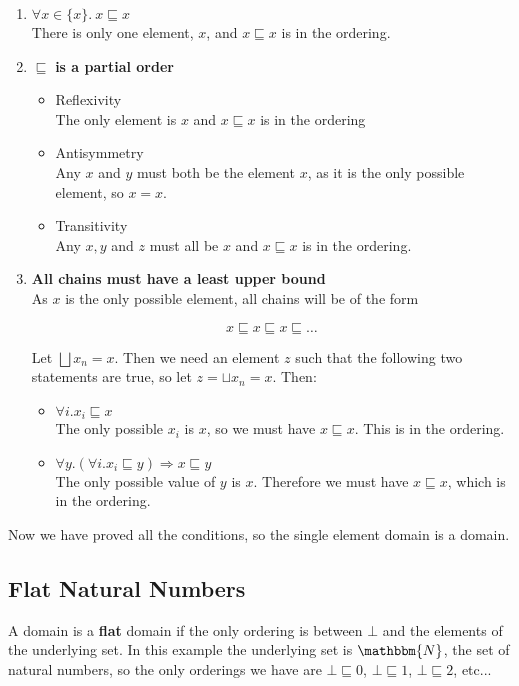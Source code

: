 \begin{enumerate}
\item{$\forall x \in \{x\}. \ x \sqsubseteq x$\\
There is only one element, $x$, and $x \sqsubseteq x$ is in the ordering.}
\item{$\sqsubseteq$ \textbf{is a partial order}
\begin{itemize}
\item{Reflexivity\\
The only element is $x$ and $x \sqsubseteq x$ is in the ordering}
\item{Antisymmetry\\
Any $x$ and $y$ must both be the element $x$, as it is the only possible element, so $x = x$.}
\item{Transitivity\\
Any $x,y$ and $z$ must all be $x$ and $x \sqsubseteq x$ is in the ordering.}
\end{itemize}}
\item{\textbf{All chains must have a least upper bound}\\
As $x$ is the only possible element, all chains will be of the form 

\[ x \sqsubseteq x  \sqsubseteq x  \sqsubseteq \dots \]

Let $\bigsqcup x_n = x$. Then we need an element $z$ such that the following two statements are true, so let $z = \sqcup x_n = x$. Then:

\begin{itemize}
\item{$\forall i. x_i \sqsubseteq x$ \\
The only possible $x_i$ is $x$, so we must have $x \sqsubseteq x$. This is in the ordering.}
\item{$\forall y. (\forall i . x_i \sqsubseteq y) \Rightarrow x \sqsubseteq y$\\
The only possible value of $y$ is $x$. Therefore we must have $x \sqsubseteq x$, which is in the ordering.}
\end{itemize}}
\end{enumerate}

\vspace{0.25cm}

Now we have proved all the conditions, so the single element domain is a domain.


\subsection{Flat Natural Numbers}\label{flat} A domain is a \textbf{flat} domain if  the only ordering is between $\bot$ and the elements of the underlying set. In this example the underlying set is  $\mathbbm{N}$, the set of natural numbers, so the only orderings we have are $\bot \sqsubseteq 0$, $\bot \sqsubseteq 1$, $\bot \sqsubseteq 2$, etc... 

